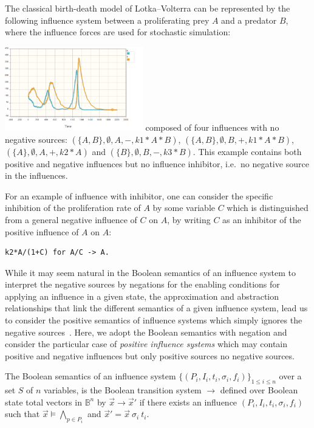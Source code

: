 \documentclass{llncs}
\newcommand{\lra}{\longrightarrow}
\begin{document}
\begin{example}\label{ex:LVi}
   The classical birth-death model of Lotka--Volterra can be represented by the following
influence system between a proliferating prey $A$ and a predator $B$,
where the influence forces are used for stochastic simulation:
  

\vspace{-2cm}\hfill\includegraphics[width=0.45\textwidth]{LVstoch.png}
   composed of four influences with no negative sources:
   $(\{A, B\}, \emptyset, A, -, k1*A*B)$, $(\{A, B\}, \emptyset, B, +, k1*A*B)$, $(\{A\}, \emptyset, A, +, k2*A)$ and $(\{B\}, \emptyset, B, -, k3*B)$.
This example contains both positive and negative influences but no influence inhibitor, i.e.~no negative source in the influences.

For an example of influence with inhibitor, one can consider the specific inhibition of the proliferation rate of $A$ by some variable $C$
which is distinguished from a general negative influence of $C$ on $A$, by writing $C$ as an inhibitor of the positive influence of $A$ on $A$:
   \begin{lstlisting}
k2*A/(1+C) for A/C -> A.
   \end{lstlisting}
\end{example}

While it may seem natural in the Boolean semantics of an influence system to interpret the negative sources by negations
for the enabling conditions for applying an influence in a given state, 
the approximation and abstraction relationships that link the different semantics of a given influence system,
lead us to consider the positive semantics of influence systems which simply ignores the negative sources~\cite{FMRS16cmsb}.
Here, we adopt the Boolean semantics with negation and consider the particular case of \emph{positive influence systems}
which may contain positive and negative influences but only positive sources no negative sources.


\begin{definition}
   The Boolean semantics of an influence system $\{(P_i, I_i, t_i, \sigma_i,
   f_i)\}_{1\leq i\leq n}$
   over a set $S$ of $n$ variables,
   is the Boolean transition system $\lra$ defined over Boolean state total vectors in $\mathbb{B}^n$
   by
   ${\vec x}\lra{\vec x'}$ if there exists an influence $(P_i, I_i, t_i, \sigma_i, f_i)$
   such that ${\vec x}\models \bigwedge_{p\in P_i}$
   and ${\vec x'} = {\vec x}\ \sigma_i\ t_i$.
\end{definition}
\end{document}
